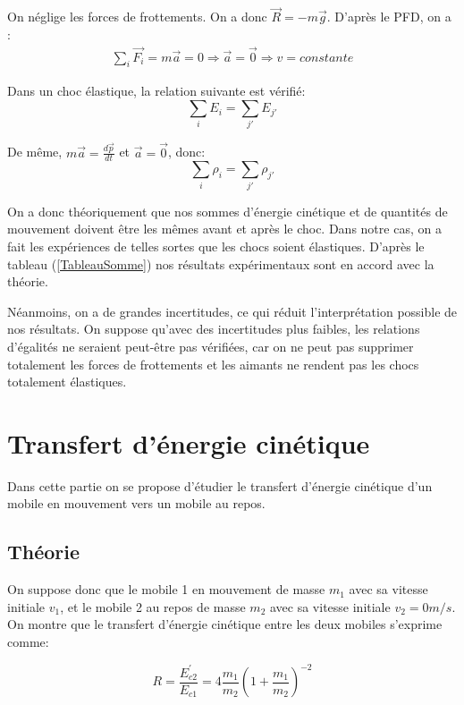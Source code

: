 \documentclass[12pt]{article}
\begin{document}
On néglige les forces de frottements. On a donc $\vec{R}=-m\vec{g}$. D'après le PFD, on a :
\begin{align*}
\sum_i\vec{F_i}=m\vec{a}=0\Rightarrow \vec{a}=\vec{0}\Rightarrow v=constante
\end{align*}

Dans un choc élastique, la relation suivante est vérifié:
\begin{equation}
\sum_i E_i=\sum_{j'}E_{j'}
\end{equation}

De même, $m\vec{a}=\frac{d\vec{p}}{dt}$ et $\vec{a}=\vec{0}$, donc:
\begin{equation}
\sum_i \rho_i=\sum_{j'}\rho_{j'}
\end{equation}

On a donc théoriquement que nos sommes d'énergie cinétique et de quantités de mouvement doivent être les mêmes avant et après le choc.
Dans notre cas, on a fait les expériences de telles sortes que les chocs soient élastiques. D'après le tableau (\ref{TableauSomme}) nos résultats expérimentaux sont en accord avec la théorie. 

Néanmoins, on a de grandes incertitudes, ce qui réduit l'interprétation possible de nos résultats. On suppose qu'avec des incertitudes plus faibles, les relations d'égalités ne seraient peut-être pas vérifiées, car  on ne peut pas supprimer totalement les forces de frottements et les aimants ne rendent pas  les chocs totalement élastiques.  

\section{Transfert d'énergie cinétique}
Dans cette partie on se propose d'étudier le transfert d'énergie cinétique d'un mobile en mouvement vers 
un mobile au repos. 

\subsection{Théorie}
On suppose donc que le mobile 1 en mouvement de masse $m_1$ avec sa vitesse initiale $v_1$, et le mobile 2 au repos de masse $m_2$ avec sa vitesse initiale
$v_2 = 0 m/s$. On montre que le transfert d'énergie cinétique entre les deux mobiles s'exprime comme:

\begin{equation}
    R = \frac{E^{'}_{c2}}{E_{c1}} = 4 \frac{m_1}{m_2} \left(1 + \frac{m_1}{m_2} \right)^{-2}
\end{equation}
\end{document}
